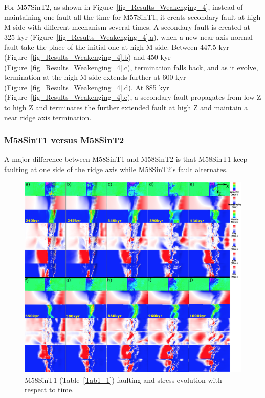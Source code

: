 For M57SinT2, as shown in Figure~\hyperref[fig_Results_Weakenging_4]{\ref{fig_Results_Weakenging_4}}, instead of maintaining one fault all the time for M57SinT1, it creats secondary fault at high M side with different mechanism several times. A secondary fault is created at 325 kyr (Figure~\hyperref[fig_Results_Weakenging_4]{\ref{fig_Results_Weakenging_4}.a}), when a new near axis normal fault take the place of the initial one at high M side. Between 447.5 kyr (Figure~\hyperref[fig_Results_Weakenging_4]{\ref{fig_Results_Weakenging_4}.b}) and 450 kyr (Figure~\hyperref[fig_Results_Weakenging_4]{\ref{fig_Results_Weakenging_4}.c}), termination falls back, and as it evolve, termination at the high M side extends further at 600 kyr (Figure~\hyperref[fig_Results_Weakenging_4]{\ref{fig_Results_Weakenging_4}.d}). At 885 kyr (Figure~\hyperref[fig_Results_Weakenging_4]{\ref{fig_Results_Weakenging_4}.e}), a secondary fault propagates from low Z to high Z and terminates the further extended fault at high Z and maintain a near ridge axis termination.

\subsubsection{M58SinT1 versus M58SinT2}

A major difference between M58SinT1 and M58SinT2 is that M58SinT1 keep faulting at one side of the ridge axis while M58SinT2's fault alternates.

\begin{figure}[h]
 \centering
  \includegraphics[width=1.0\textwidth]{./Figures/fig_Results_Weakening_5_M58SinT1_time_evolution.eps}
 \caption{M58SinT1 (Table~\hyperref[Tab1_1]{\ref{Tab1_1}}) faulting and stress evolution with respect to time.}
\label{fig_Results_Weakenging_5}
\end{figure}

